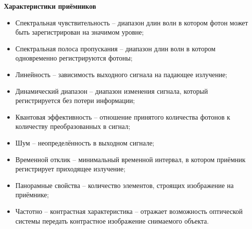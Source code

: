 \documentclass[12pt]{article}
\begin{document}
\begin{itemize}
	
	\textbf{Характеристики приёмников}
	\begin{itemize}
		\item Спектральная чувствительность -- диапазон длин волн в котором фотон может быть зарегистрирован на значимом уровне;
		\item Спектральная полоса пропускания -- диапазон длин волн в котором одновременно регистрируются фотоны;
		\item  Линейность -- зависимость выходного сигнала на падающее излучение;
		\item	Динамический диапазон -- диапазон изменения сигнала, который регистрируется без потери информации;
		\item Квантовая эффективность -- отношение принятого количества фотонов к количеству преобразованных в сигнал;
		\item Шум -- неопределённость в выходном сигнале;
		\item Временной отклик -- минимальный временной интервал, в котором приёмник регистрирует
		приходящее излучение;
		\item Панорамные свойства -- количество элементов, строящих изображение на приёмнике;
		\item Частотно -- контрастная характеристика -- отражает
		возможность оптической
		системы передать контрастное изображение
		снимаемого объекта.
	\end{itemize}
\end{itemize}
\end{document}
